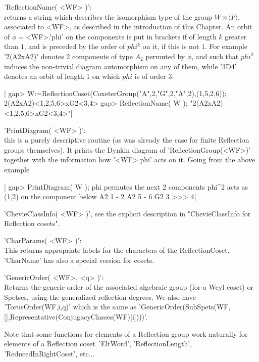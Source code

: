 'ReflectionName( <WF> )':\\ returns a string which describes the isomorphism
   type  of the  group $W\rtimes\langle  F\rangle$, associated  to <WF>, as
   described   in   the   introduction   of   this  Chapter.  An  orbit  of
   $\phi=$<WF>.'phi'  on the components is put in brackets if of length $k$
   greater than $1$, and is preceded by the order of $phi^k$ on it, if this
   is  not $1$.  For example  '\"2(A2xA2)\"' denotes  2 components  of type
   $A_2$  permuted by $\phi$, and such that $phi^2$ induces the non-trivial
   diagram  automorphism on  any of  them, while  '3D4' denotes an orbit of
   length 1 on which $phi$ is of order 3.

|    gap> W:=ReflectionCoset(CoxeterGroup("A",2,"G",2,"A",2),(1,5,2,6));
    2(A2xA2)<1,2,5,6>xG2<3,4>
    gap> ReflectionName( W );
    "2(A2xA2)<1,2,5,6>xG2<3,4>"|

'PrintDiagram( <WF> )':\\ this is  a purely  descriptive routine  (as was
     already  the case for finite  Reflection groups themselves). It prints
     the  Dynkin  diagram  of  'ReflectionGroup(<WF>)'  together  with  the
     information how '<WF>.phi' acts on it. Going from the above example\:

|    gap> PrintDiagram( W );
    phi permutes the next 2 components
    phi^2 acts as (1,2) on the component below
    A2 1 - 2
    A2 5 - 6
    G2 3 >>> 4|

'ChevieClassInfo(   <WF>   )',   see   the   explicit   description   in
"ChevieClassInfo for Reflection cosets".

'CharParams(  <WF> )':\\ This returns appropriate labels for the characters
of the ReflectionCoset. 'CharName' has also a special version for cosets.

'GenericOrder(  <WF>, <q> )':\\ Returns the generic order of the associated
     algebraic  group (for a Weyl coset)  or Spetses, using the generalized
     reflection  degrees. We  also have  'TorusOrder(WF,i,q)' which  is the
     same as
     'GenericOrder(SubSpets(WF,[],Representative(ConjugacyClasses(WF)[i])))'.

Note  that  some  functions  for   elements  of  a  Reflection  group  work
naturally   for   elements   of  a   Reflection   coset\:\
'EltWord',    'ReflectionLength', 'ReducedInRightCoset', etc$\ldots$

